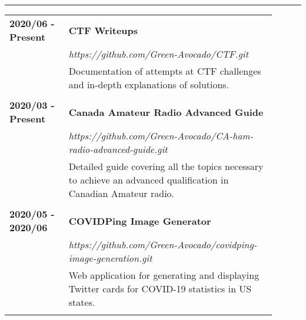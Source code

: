 \documentclass[letterpaper]{article}
\newcommand{\horizontalLine}{%
    \rule{\linewidth}{0.4pt}
    \vspace{1ex}
}
\begin{document}
        \horizontalLine

        \begin{tabular}{p{0.2\linewidth} p{0.7\linewidth}} 
            \textbf{2020/06 - Present} & \large\textbf{CTF Writeups} \\
            & \emph{https://github.com/Green-Avocado/CTF.git} \\
            & Documentation of attempts at CTF challenges and in-depth explanations of solutions. \\
            \\
            \textbf{2020/03 - Present} & \large\textbf{Canada Amateur Radio Advanced Guide} \\
            & \emph{https://github.com/Green-Avocado/CA-ham-radio-advanced-guide.git} \\
            & Detailed guide covering all the topics necessary to achieve an advanced qualification in Canadian Amateur radio. \\
            \\
            \textbf{2020/05 - 2020/06} & \large\textbf{COVIDPing Image Generator} \\
            & \emph{https://github.com/Green-Avocado/covidping-image-generation.git} \\
            & Web application for generating and displaying Twitter cards for COVID-19 statistics in US states. \\
            \\
        \end{tabular}
\end{document}

